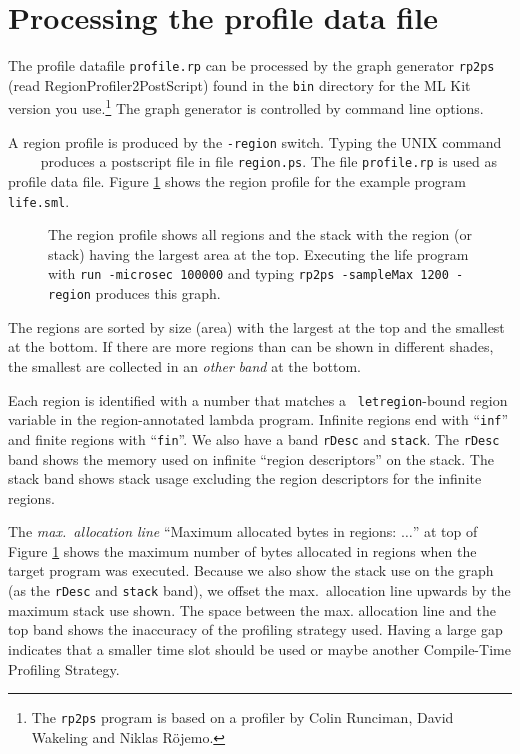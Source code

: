 \documentclass[12pt]{book}
\begin{document}
\section{Processing the profile data file}
The profile datafile \texttt{profile.rp} can be processed by the graph
generator \texttt{rp2ps} (read RegionProfiler2PostScript) found in the
\texttt{bin} directory for the ML Kit version you use.\footnote{The
  \texttt{rp2ps} program is based on a profiler by Colin Runciman,
  David Wakeling and Niklas R\"{o}jemo.} The graph generator is
controlled by command line options.

A region profile is produced by the
\texttt{-region} switch. Typing
the UNIX command ~~~~ produces a postscript file in
file \texttt{region.ps}. The file \texttt{profile.rp} is used as profile
data file. Figure \ref{prof_eks1.fig} shows the region profile for
the example program \texttt{life.sml}.
\begin{figure}[htb]
\begin{center}
  \caption{The region profile shows all
          regions and the stack with the region (or stack) having the
          largest area at the top. Executing the life program with
          \texttt{run -microsec 100000} and typing \texttt{rp2ps
            -sampleMax 1200 -region} produces this graph.}\label{prof_eks1.fig}
\end{center}
\end{figure}
The regions are sorted by size (area) with the largest at the top and the
smallest at the bottom. If there are more regions than can be shown in
different shades, the smallest are collected in an {\em other\/}
\emph{band} at the bottom.

Each region is identified with a number that matches a {\tt
  letregion}-bound region variable in the region-annotated lambda
program. Infinite regions end with ``{\tt inf}'' and finite regions
with ``{\tt fin}''. We also have a band \texttt{rDesc} and
\texttt{stack}. The \texttt{rDesc} band shows the memory used on
infinite ``region descriptors'' on the stack. The stack band shows
stack usage excluding the region descriptors for the infinite regions.

The \emph{max.\ allocation line} ``Maximum allocated bytes in regions:
$\ldots$'' at top of Figure \ref{prof_eks1.fig} shows the maximum number of
bytes allocated in regions when the target program was executed. Because we
also show the stack use on the graph (as the {\tt rDesc} and {\tt stack} band), we
offset the max.\ allocation line upwards by the maximum stack use shown. The
space between the max. allocation line and the top band shows the
inaccuracy of the profiling strategy used. Having a large gap indicates
that a smaller time slot should be used or maybe another Compile-Time Profiling
Strategy.
\end{document}

